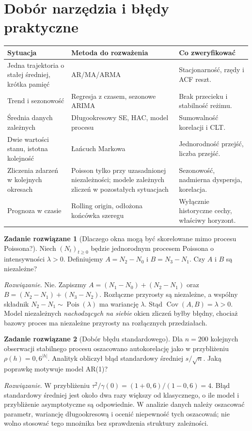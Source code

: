 \documentclass[11pt,a4paper,oneside]{report}
\numberwithin{equation}{chapter}
\theoremstyle{plain}
\theoremstyle{definition}
\newtheorem{zadanie}{Zadanie rozwiązane}[chapter]
\theoremstyle{remark}
\newcommand{\Cov}{\operatorname{Cov}}
\DeclareMathOperator{\Pois}{Pois}
\begin{document}
\section{Dobór narzędzia i błędy praktyczne}
\begin{center}\small
\begin{tabular}{>{\raggedright\arraybackslash}p{}>{\raggedright\arraybackslash}p{}>{\raggedright\arraybackslash}p{}}
\toprule
\textbf{Sytuacja} & \textbf{Metoda do rozważenia} & \textbf{Co zweryfikować}\\
\midrule
Jedna trajektoria o stałej średniej, krótka pamięć & AR/MA/ARMA & Stacjonarność, rzędy i ACF reszt.\\
Trend i sezonowość & Regresja z czasem, sezonowe ARIMA & Brak przecieku i stabilność reżimu.\\
Średnia danych zależnych & Długookresowy SE, HAC, model procesu & Sumowalność korelacji i CLT.\\
Dwie wartości stanu, istotna kolejność & Łańcuch Markowa & Jednorodność przejść, liczba przejść.\\
Zliczenia zdarzeń w kolejnych okresach & Poisson tylko przy uzasadnionej niezależności; modele zależnych zliczeń w pozostałych sytuacjach & Sezonowość, nadmierna dyspersja, korelacja.\\
Prognoza w czasie & Rolling origin, odłożona końcówka szeregu & Wyłącznie historyczne cechy, właściwy horyzont.\\
\bottomrule
\end{tabular}
\end{center}

\begin{zadanie}[Dlaczego okna mogą być skorelowane mimo procesu Poissona?]
Niech $(N_t)_{t\ge0}$ będzie jednorodnym procesem
Poissona o intensywności $\lambda>0$. Definiujemy
$A=N_2-N_0$ i $B=N_3-N_1$. Czy $A$ i $B$ są niezależne?
\par\emph{Rozwiązanie.} Nie. Zapiszmy
$A=(N_1-N_0)+(N_2-N_1)$ oraz
$B=(N_2-N_1)+(N_3-N_2)$.
Rozłączne przyrosty są niezależne, a wspólny składnik
$N_2-N_1\sim\Pois(\lambda)$ ma wariancję $\lambda$.
Stąd $\Cov(A,B)=\lambda>0$.
Model niezależnych \emph{nachodzących na siebie} okien
zliczeń byłby błędny, chociaż bazowy proces ma
niezależne przyrosty na rozłącznych przedziałach.
\end{zadanie}

\begin{zadanie}[Dobór błędu standardowego]
Dla $n=200$ kolejnych obserwacji stabilnego procesu
oszacowano autokorelację jako w przybliżeniu
$\rho(h)=0{,}6^{|h|}$. Analityk obliczył błąd
standardowy średniej $s/\sqrt n$. Jaką poprawkę
motywuje model AR(1)?
\par\emph{Rozwiązanie.} W przybliżeniu
$\tau^2/\gamma(0)=(1+0{,}6)/(1-0{,}6)=4$.
Błąd standardowy średniej jest około dwa razy
większy od klasycznego, o ile model i przybliżenie
asymptotyczne są odpowiednie. W analizie danych należy
oszacować parametr, wariancję długookresową i ocenić
niepewność tych oszacowań; nie wolno stosować
tego mnożnika bez sprawdzenia struktury zależności.
\end{zadanie}
\end{document}
